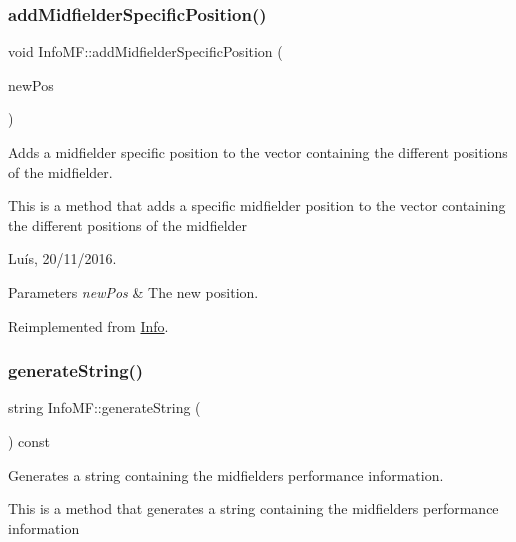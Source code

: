 \subsubsection{\texorpdfstring{add\+Midfielder\+Specific\+Position()}{addMidfielderSpecificPosition()}}
{\footnotesize\ttfamily void Info\+M\+F\+::add\+Midfielder\+Specific\+Position (\begin{DoxyParamCaption}\item[{\hyperlink{_utils_8hpp_a9f9328fe291d23e820ad594679abd217}{Midfielder\+Position}}]{new\+Pos }\end{DoxyParamCaption})\hspace{0.3cm}{\ttfamily [virtual]}}



Adds a midfielder specific position to the vector containing the different positions of the midfielder. 

This is a method that adds a specific midfielder position to the vector containing the different positions of the midfielder

Luís, 20/11/2016. 


\begin{DoxyParams}{Parameters}
{\em new\+Pos} & The new position. \\
\hline
\end{DoxyParams}


Reimplemented from \hyperlink{class_info_ad90cc81b8a235763cf4127d90aa3a66a}{Info}.

\hypertarget{class_info_m_f_ac61b01c6bfed2c31bd4ddbc2baba097d}{}\label{class_info_m_f_ac61b01c6bfed2c31bd4ddbc2baba097d} 
\subsubsection{\texorpdfstring{generate\+String()}{generateString()}}
{\footnotesize\ttfamily string Info\+M\+F\+::generate\+String (\begin{DoxyParamCaption}{ }\end{DoxyParamCaption}) const\hspace{0.3cm}{\ttfamily [virtual]}}



Generates a string containing the midfielder\textquotesingle{}s performance information. 

This is a method that generates a string containing the midfielder\textquotesingle{}s performance information

